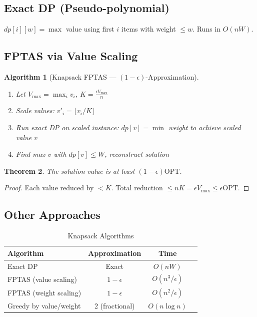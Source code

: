 \documentclass[11pt,oneside]{book}
\newtheorem{theorem}{Theorem}[chapter]
\newtheorem{algorithmdef}[theorem]{Algorithm}
\newcommand{\OPT}{\mathrm{OPT}}
\begin{document}
\subsection{Exact DP (Pseudo-polynomial)}

$dp[i][w] = \max$ value using first $i$ items with weight $\leq w$. Runs in $O(nW)$.

\subsection{FPTAS via Value Scaling}

\begin{algorithmdef}[Knapsack FPTAS — $(1-\epsilon)$-Approximation]
\begin{enumerate}
    \item Let $V_{\max} = \max_i v_i$, $K = \frac{\epsilon V_{\max}}{n}$
    \item Scale values: $v'_i = \lfloor v_i / K \rfloor$
    \item Run exact DP on scaled instance: $dp[v] = \min$ weight to achieve scaled value $v$
    \item Find max $v$ with $dp[v] \leq W$, reconstruct solution
\end{enumerate}
\end{algorithmdef}

\begin{theorem}
The solution value is at least $(1-\epsilon)\OPT$.
\end{theorem}
\begin{proof}
Each value reduced by $< K$. Total reduction $\leq nK = \epsilon V_{\max} \leq \epsilon \OPT$.
\end{proof}

\subsection{Other Approaches}

\begin{table}[H]
\centering
\caption{Knapsack Algorithms}
\begin{tabular}{lccc}
\toprule
Algorithm & Approximation & Time \\
\midrule
Exact DP & Exact & $O(nW)$ \\
FPTAS (value scaling) & $1-\epsilon$ & $O(n^3/\epsilon)$ \\
FPTAS (weight scaling) & $1-\epsilon$ & $O(n^2/\epsilon)$ \\
Greedy by value/weight & 2 (fractional) & $O(n \log n)$ \\
\bottomrule
\end{tabular}
\end{table}
\end{document}
